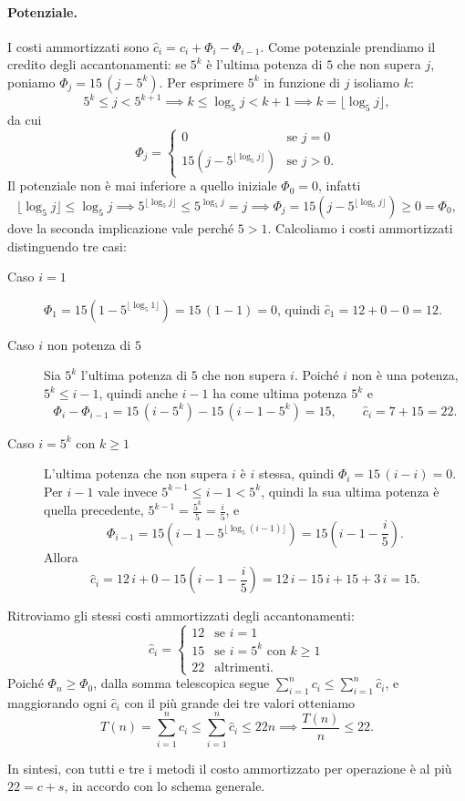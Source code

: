 \paragraph{Potenziale.}
I costi ammortizzati sono $\hat{c}_i = c_i + \Phi_i - \Phi_{i-1}$. Come potenziale prendiamo il credito degli accantonamenti: se $5^k$ è l'ultima potenza di $5$ che non supera $j$, poniamo $\Phi_j = 15\,(j - 5^k)$. Per esprimere $5^k$ in funzione di $j$ isoliamo $k$:
\[
5^k \le j < 5^{k+1} \implies k \le \log_5 j < k + 1 \implies k = \lfloor \log_5 j \rfloor,
\]
da cui
\[
\Phi_j =
\begin{cases}
    0 & \text{se } j = 0 \\
    15\left(j - 5^{\lfloor \log_5 j \rfloor}\right) & \text{se } j > 0 .
\end{cases}
\]
Il potenziale non è mai inferiore a quello iniziale $\Phi_0 = 0$, infatti
\[
\lfloor \log_5 j \rfloor \le \log_5 j \implies 5^{\lfloor \log_5 j \rfloor} \le 5^{\log_5 j} = j \implies \Phi_j = 15\left(j - 5^{\lfloor \log_5 j \rfloor}\right) \ge 0 = \Phi_0,
\]
dove la seconda implicazione vale perché $5 > 1$. Calcoliamo i costi ammortizzati distinguendo tre casi:
\begin{description}
    \item[Caso $i = 1$] $\Phi_1 = 15\left(1 - 5^{\lfloor \log_5 1 \rfloor}\right) = 15\,(1 - 1) = 0$, quindi $\hat{c}_1 = 12 + 0 - 0 = 12$.
    \item[Caso $i$ non potenza di $5$] Sia $5^k$ l'ultima potenza di $5$ che non supera $i$. Poiché $i$ non è una potenza, $5^k \le i - 1$, quindi anche $i-1$ ha come ultima potenza $5^k$ e
    \[
    \Phi_i - \Phi_{i-1} = 15\,(i - 5^k) - 15\,(i - 1 - 5^k) = 15,
    \qquad
    \hat{c}_i = 7 + 15 = 22 .
    \]
    \item[Caso $i = 5^k$ con $k \ge 1$] L'ultima potenza che non supera $i$ è $i$ stessa, quindi $\Phi_i = 15\,(i - i) = 0$. Per $i - 1$ vale invece $5^{k-1} \le i - 1 < 5^k$, quindi la sua ultima potenza è quella precedente, $5^{k-1} = \frac{5^k}{5} = \frac{i}{5}$, e
    \[
    \Phi_{i-1} = 15\left(i - 1 - 5^{\lfloor \log_5 (i-1) \rfloor}\right) = 15\left(i - 1 - \frac{i}{5}\right).
    \]
    Allora
    \[
    \hat{c}_i = 12\,i + 0 - 15\left(i - 1 - \frac{i}{5}\right) = 12\,i - 15\,i + 15 + 3\,i = 15 .
    \]
\end{description}
Ritroviamo gli stessi costi ammortizzati degli accantonamenti:
\[
\hat{c}_i =
\begin{cases}
    12 & \text{se } i = 1 \\
    15 & \text{se } i = 5^k \text{ con } k \ge 1 \\
    22 & \text{altrimenti.}
\end{cases}
\]
Poiché $\Phi_n \ge \Phi_0$, dalla somma telescopica segue $\sum_{i=1}^{n} c_i \le \sum_{i=1}^{n} \hat{c}_i$, e maggiorando ogni $\hat{c}_i$ con il più grande dei tre valori otteniamo
\[
T(n) = \sum_{i=1}^{n} c_i \le \sum_{i=1}^{n} \hat{c}_i \le 22n \implies \frac{T(n)}{n} \le 22 .
\]

In sintesi, con tutti e tre i metodi il costo ammortizzato per operazione è al più $22 = c + s$, in accordo con lo schema generale.